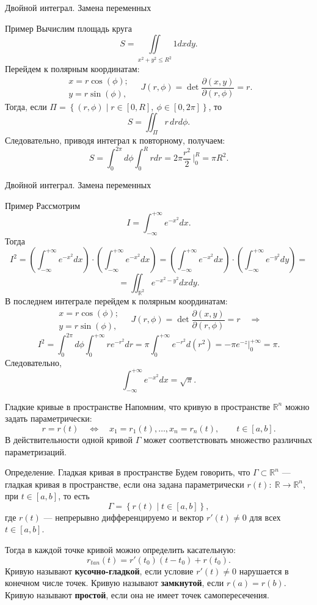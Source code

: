 \documentclass[8pt]{beamer}
\newcommand{\pp}[2]{\frac{\partial #1}{\partial #2}}
\begin{document}
\begin{frame}{Двойной интеграл. Замена переменных}
\begin{block}{Пример}
Вычислим площадь круга
$$S = \iint\limits_{x^2+y^2\le R^2}1dxdy.$$
Перейдем к полярным координатам:
$$\begin{array}{l}
x = r \cos(\phi);\\
y = r \sin(\phi),
\end{array}
\quad J(r,\phi) = \det\pp{(x,y)}{(r,\phi)} = r.
$$
Тогда, если $\Pi = \left\{ (r,\phi)\mid r\in[0,R],\ \phi\in[0,2\pi]\right\}$, то
$$S = \iint_\Pi r\,drd\phi.$$
Следовательно, приводя интеграл к повторному, получаем:
$$S = \int_0^{2\pi}d\phi \int_0^R rdr = 2\pi \frac{r^2}{2}\,\Big|_0^R = \pi R^2.$$
\end{block}
\end{frame}

\begin{frame}{Двойной интеграл. Замена переменных}
\begin{block}{Пример}
Рассмотрим 
$$I = \int_{-\infty}^{+\infty}e^{-x^2}dx.$$
Тогда
$$I^2 = \left(\int_{-\infty}^{+\infty}e^{-x^2}dx\right) \cdot \left(\int_{-\infty}^{+\infty}e^{-x^2}dx\right) = \left(\int_{-\infty}^{+\infty}e^{-x^2}dx\right)\cdot \left(\int_{-\infty}^{+\infty}e^{-y^2}dy\right)=$$
$$ = \iint_{\mathbb{R}^2}e^{-x^2-y^2}dxdy.$$
В последнем интеграле перейдем к полярным координатам:
$$\begin{array}{l}
x = r \cos(\phi);\\
y = r \sin(\phi),
\end{array}
\quad J(r,\phi) = \det\pp{(x,y)}{(r,\phi)} = r\quad \Rightarrow
$$
$$I^2 = \int_0^{2\pi}d\phi \int_{0}^{+\infty}r e^{-r^2}dr = \pi \int_{0}^{+\infty}e^{-r^2}d(r^2) = -\pi e^{-z}\Big|_0^{+\infty} = \pi.$$
Следовательно,
$$\int_{-\infty}^{+\infty}e^{-x^2}dx = \sqrt{\pi}.$$
\end{block}
\end{frame}

\begin{frame}{Гладкие кривые в пространстве}
Напомним, что кривую в пространстве $\mathbb{R}^n$ можно задать параметрически:
$$r=r(t)\quad \iff\quad x_1=r_1(t),\ldots,x_n = r_n(t),\qquad t\in[a,b].$$
В действительности одной кривой $\Gamma$ может соответствовать множество различных параметризаций. 
\begin{block}{Определение. Гладкая кривая в пространстве}
Будем говорить, что $\Gamma\subset\mathbb{R}^n$ --- гладкая кривая в пространстве, если она задана параметрически $r(t):\ \mathbb{R} \to \mathbb{R}^n$, при $t\in[a,b]$, то есть
$$\Gamma = \left\{ r(t) \mid t\in[a,b]\right\},$$
где $r(t)$ --- непрерывно дифференцируемо и вектор $r'(t)\ne0$ для всех $t\in[a,b]$.
\end{block}
Тогда в каждой точке кривой можно определить касательную:
$$r_{tan}(t) = r'(t_0)(t-t_0)+r(t_0).$$
Кривую называют {\bf кусочно-гладкой}, если условие $r'(t)\ne0$ нарушается в конечном числе точек. Кривую называют {\bf замкнутой}, если $r(a) = r(b)$. Кривую называют {\bf простой}, если она не имеет точек самопересечения.
\end{frame}
\end{document}
